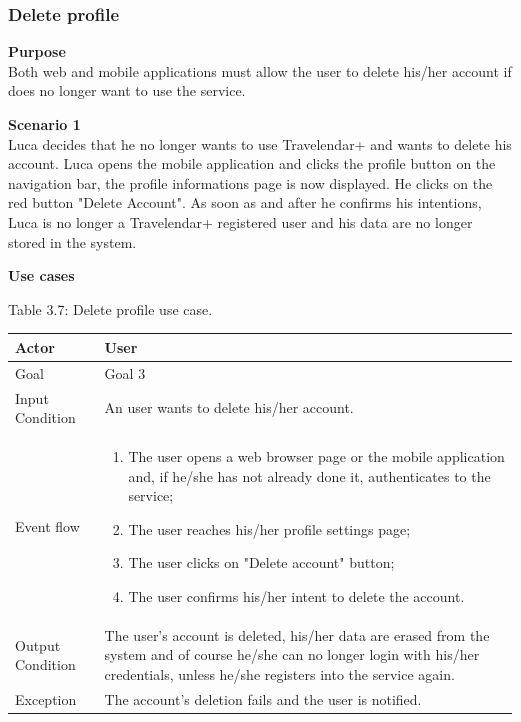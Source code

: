 \documentclass{article}
\begin{document}
	\subsubsection{Delete profile}
	
	\bigskip
	\noindent
	\textbf{Purpose} \\
	Both web and mobile applications must allow the user to delete his/her account if does no longer want to use the service.
	
	\bigskip
	\noindent
	\textbf{Scenario 1} \\
	Luca decides that he no longer wants to use Travelendar+ and wants to delete his account. Luca opens the mobile application and clicks the profile button on the navigation bar, the profile informations page is now displayed. He clicks on the red button "Delete Account". As soon as and after he confirms his intentions, Luca is no longer a Travelendar+ registered user and  his data are no longer stored in the system.
	
	\bigskip
	\noindent
	\textbf{Use cases} \\
	
	\begin{center}
		Table 3.7: Delete profile use case.
		
		\bigskip
    			\begin{tabular}{p{}|p{}}
   		 	\hline
    			Actor & User \\ \hline
    			Goal & Goal 3 \\ \hline
    			Input Condition & An user wants to delete his/her account. \\ \hline
    			Event flow & 
			\begin{enumerate}
  				\item The user opens a web browser page or the mobile application and, if he/she has not already done it, authenticates to the service;
  				\item The user reaches his/her profile settings page;
  				\item The user clicks on "Delete account" button;
  				\item The user confirms his/her intent to delete the account.
 			 \end{enumerate} \\ \hline
    			Output Condition & The user’s account is deleted, his/her data are erased from the system and of course he/she can no longer login with his/her credentials, unless he/she registers into the service again. \\ \hline
    			Exception & The account's deletion fails and the user is notified. \\
    			\hline
    		\end{tabular}
	\end{center}
	
\end{document}
